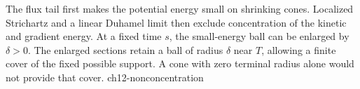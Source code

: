 {The flux tail first makes the potential energy small on shrinking cones.
Localized Strichartz and a linear Duhamel limit then exclude concentration
of the kinetic and gradient energy. At a fixed time $s$, the small-energy
ball can be enlarged by $\delta>0$. The enlarged sections retain a ball
of radius $\delta$ near $T$, allowing a finite cover of the fixed possible
support. A cone with zero terminal radius alone would not provide that cover.}
{ch12-nonconcentration}
